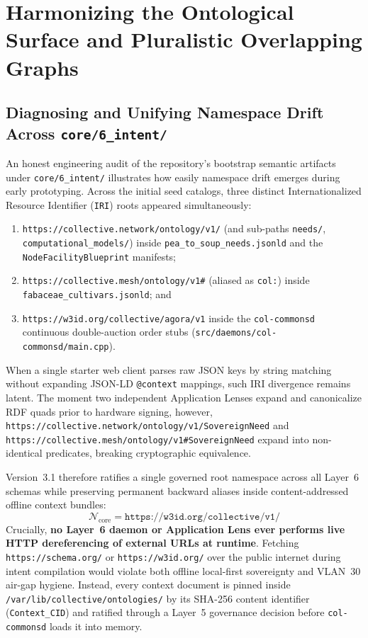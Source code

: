 \section{Harmonizing the Ontological Surface and Pluralistic Overlapping Graphs}
\label{sec:pluralistic-ontologies}

\subsection{Diagnosing and Unifying Namespace Drift Across \texttt{core/6\_intent/}}

An honest engineering audit of the repository's bootstrap semantic artifacts under \texttt{core/6\_intent/} illustrates how easily namespace drift emerges during early prototyping. Across the initial seed catalogs, three distinct Internationalized Resource Identifier (\texttt{IRI}) roots appeared simultaneously:
\begin{enumerate}
    \item \texttt{https://collective.network/ontology/v1/} (and sub-paths \texttt{needs/}, \texttt{computational\_models/}) inside \texttt{pea\_to\_soup\_needs.jsonld} and the \texttt{NodeFacilityBlueprint} manifests;
    \item \texttt{https://collective.mesh/ontology/v1\#} (aliased as \texttt{col:}) inside \texttt{fabaceae\_cultivars.jsonld}; and
    \item \texttt{https://w3id.org/collective/agora/v1} inside the \texttt{col-commonsd} continuous double-auction order stubs (\texttt{src/daemons/col-commonsd/main.cpp}).
\end{enumerate}

When a single starter web client parses raw JSON keys by string matching without expanding JSON-LD \texttt{@context} mappings, such IRI divergence remains latent. The moment two independent Application Lenses expand and canonicalize RDF quads prior to hardware signing, however, \texttt{https://collective.network/ontology/v1/SovereignNeed} and \texttt{https://collective.mesh/ontology/v1\#SovereignNeed} expand into non-identical predicates, breaking cryptographic equivalence.

Version~3.1 therefore ratifies a single governed root namespace across all Layer~6 schemas while preserving permanent backward aliases inside content-addressed offline context bundles:
\begin{equation}
    \mathcal{N}_{\mathrm{core}} = \texttt{https://w3id.org/collective/v1/}
\end{equation}
Crucially, \textbf{no Layer~6 daemon or Application Lens ever performs live HTTP dereferencing of external URLs at runtime}. Fetching \texttt{https://schema.org/} or \texttt{https://w3id.org/} over the public internet during intent compilation would violate both offline local-first sovereignty \parencite{kleppmann2019localfirst} and VLAN~30 air-gap hygiene. Instead, every context document is pinned inside \texttt{/var/lib/collective/ontologies/} by its SHA-256 content identifier (\texttt{Context\_CID}) and ratified through a Layer~5 governance decision before \texttt{col-commonsd} loads it into memory.

